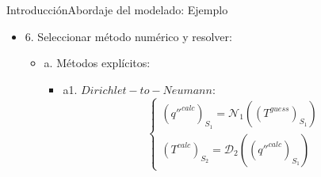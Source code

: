 \begin{frame}{Introducción}{Abordaje del modelado: Ejemplo}
\begin{itemize}
\item 6. Seleccionar método numérico y resolver: 
  \begin{itemize}
  \item a. Métodos explícitos:
    \begin{itemize}
    \item a1. $Dirichlet-to-Neumann$:
      \begin{equation*}
      \left\{\begin{matrix}
      (q''^{calc})_{S_1} = \mathscr{N}_1\left ((T^{guess})_{S_1}\right ) \\
      (T^{calc})_{S_2} = \mathscr{D}_2\left ((q''^{calc})_{S_1}\right )
      \end{matrix}\right.
      \end{equation*}
    \end{itemize}
  \end{itemize}
\end{itemize}

\end{frame}

